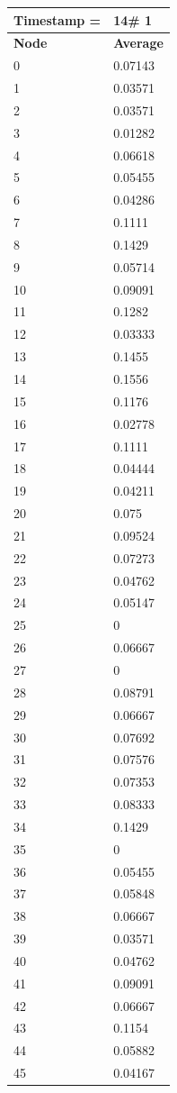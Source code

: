 \begin{tabular}{|l||l|}
\hline
\textbf{Timestamp =} & \textbf{14}\# 1\\\hline
	\textbf{Node} & \textbf{Average} \\ \hline
\hline
	0 & 0.07143 \\ \hline
	1 & 0.03571 \\ \hline
	2 & 0.03571 \\ \hline
	3 & 0.01282 \\ \hline
	4 & 0.06618 \\ \hline
	5 & 0.05455 \\ \hline
	6 & 0.04286 \\ \hline
	7 & 0.1111 \\ \hline
	8 & 0.1429 \\ \hline
	9 & 0.05714 \\ \hline
	10 & 0.09091 \\ \hline
	11 & 0.1282 \\ \hline
	12 & 0.03333 \\ \hline
	13 & 0.1455 \\ \hline
	14 & 0.1556 \\ \hline
	15 & 0.1176 \\ \hline
	16 & 0.02778 \\ \hline
	17 & 0.1111 \\ \hline
	18 & 0.04444 \\ \hline
	19 & 0.04211 \\ \hline
	20 & 0.075 \\ \hline
	21 & 0.09524 \\ \hline
	22 & 0.07273 \\ \hline
	23 & 0.04762 \\ \hline
	24 & 0.05147 \\ \hline
	25 & 0 \\ \hline
	26 & 0.06667 \\ \hline
	27 & 0 \\ \hline
	28 & 0.08791 \\ \hline
	29 & 0.06667 \\ \hline
	30 & 0.07692 \\ \hline
	31 & 0.07576 \\ \hline
	32 & 0.07353 \\ \hline
	33 & 0.08333 \\ \hline
	34 & 0.1429 \\ \hline
	35 & 0 \\ \hline
	36 & 0.05455 \\ \hline
	37 & 0.05848 \\ \hline
	38 & 0.06667 \\ \hline
	39 & 0.03571 \\ \hline
	40 & 0.04762 \\ \hline
	41 & 0.09091 \\ \hline
	42 & 0.06667 \\ \hline
	43 & 0.1154 \\ \hline
	44 & 0.05882 \\ \hline
	45 & 0.04167 \\ \hline
\end{tabular}
